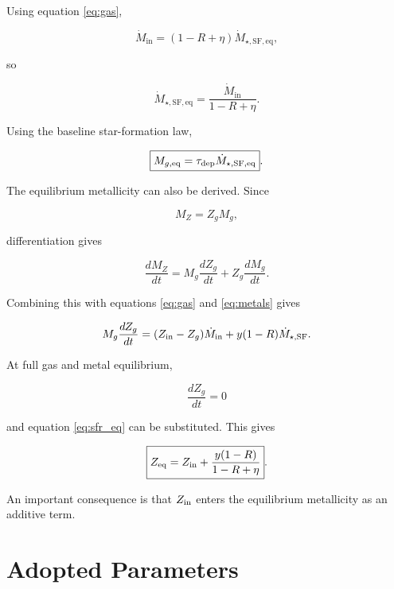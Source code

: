 \documentclass[10pt,a4paper]{article}
\newcommand{\SFR}{\dot{M}_{\star,\mathrm{SF}}}
\newcommand{\SFReq}{\dot{M}_{\star,\mathrm{SF,eq}}}
\newcommand{\Mgin}{\dot{M}_{\mathrm{in}}}
\begin{document}
Using equation \ref{eq:gas},

\begin{equation}
\Mgin=(1-R+\eta)\SFReq,
\end{equation}

so

\begin{equation}
\boxed{
\SFReq
=
\frac{\Mgin}{1-R+\eta}
}.
\label{eq:sfr_eq}
\end{equation}

Using the baseline star-formation law,

\begin{equation}
\boxed{
M_{g,\rm eq}
=
\tau_{\rm dep}\SFReq
}.
\label{eq:mg_eq}
\end{equation}

The equilibrium metallicity can also be derived. Since

\begin{equation}
M_Z=Z_gM_g,
\end{equation}

differentiation gives

\begin{equation}
\frac{dM_Z}{dt}
=
M_g\frac{dZ_g}{dt}
+
Z_g\frac{dM_g}{dt}.
\end{equation}

Combining this with equations \ref{eq:gas} and \ref{eq:metals} gives

\begin{equation}
M_g\frac{dZ_g}{dt}
=
(Z_{\rm in}-Z_g)\Mgin
+
y(1-R)\SFR.
\end{equation}

At full gas and metal equilibrium,

\begin{equation}
\frac{dZ_g}{dt}=0
\end{equation}

and equation \ref{eq:sfr_eq} can be substituted. This gives

\begin{equation}
\boxed{
Z_{\rm eq}
=
Z_{\rm in}
+
\frac{y(1-R)}
{1-R+\eta}
}.
\label{eq:z_eq}
\end{equation}

An important consequence is that \(Z_{\rm in}\) enters the equilibrium metallicity as an additive term.

\section{Adopted Parameters}
\end{document}
